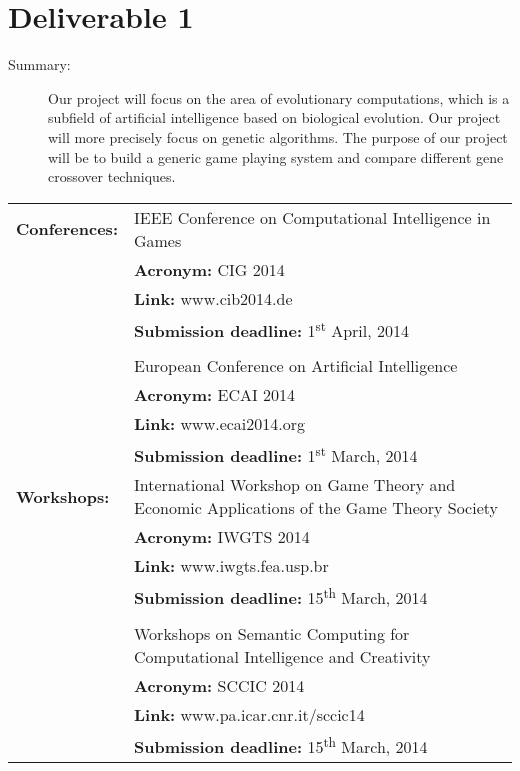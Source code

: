 \section{Deliverable 1}

\begin{description}
  \item [Summary:] Our project will focus on the area of evolutionary
    computations, which is a subfield of artificial intelligence
    based on biological evolution. Our project will more precisely
    focus on genetic algorithms. The purpose of our project will be
    to build a generic game playing system and compare different
    gene crossover techniques.
\end{description}

\begin{tabular}{l p{}}
  \textbf{Conferences:} & IEEE Conference on Computational Intelligence in Games \\
                        & \textbf{Acronym:} CIG 2014 \\	
                        & \textbf{Link:} www.cib2014.de \\
                        & \textbf{Submission deadline:} 1\textsuperscript{st} April, 2014 \\
                        & \\
                        & European Conference on Artificial Intelligence \\
                        & \textbf{Acronym:} ECAI 2014 \\	
                        & \textbf{Link:} www.ecai2014.org \\
                        & \textbf{Submission deadline:} 1\textsuperscript{st} March, 2014 \\
  \textbf{Workshops:}   & International Workshop on Game Theory and Economic
                          Applications of the Game Theory Society \\
                        & \textbf{Acronym:} IWGTS 2014 \\	
                        & \textbf{Link:} www.iwgts.fea.usp.br\\
                        & \textbf{Submission deadline:} 15\textsuperscript{th} March, 2014 \\
                        & \\
                        & Workshops on Semantic Computing for Computational Intelligence and Creativity \\
                        & \textbf{Acronym:} SCCIC 2014 \\	
                        & \textbf{Link:} www.pa.icar.cnr.it/sccic14 \\
                        & \textbf{Submission deadline:} 15\textsuperscript{th} March, 2014 \\
\end{tabular}

